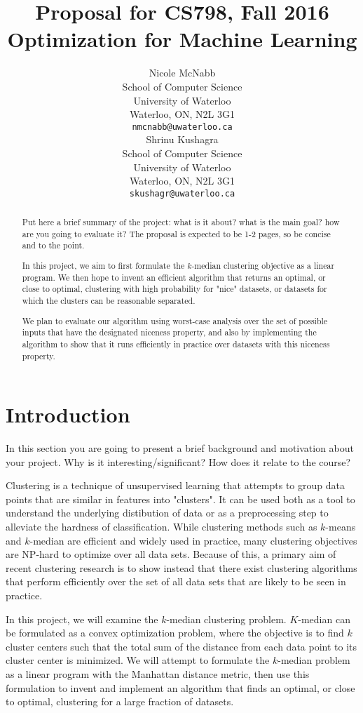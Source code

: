 \documentclass{article}
\title{Proposal for CS798, Fall 2016\\ \large Optimization for Machine Learning}
\author{
	Nicole McNabb \\
	School of Computer Science\\
	University of Waterloo\\
	Waterloo, ON, N2L 3G1 \\
	\texttt{nmcnabb@uwaterloo.ca} \\
	\And
	Shrinu Kushagra\\
	School of Computer Science\\
	University of Waterloo\\
	Waterloo, ON, N2L 3G1 \\
	\texttt{skushagr@uwaterloo.ca} \\	
}
\begin{document}
\maketitle

\begin{abstract} 
Put here a brief summary of the project: what is it about? what is the main goal? how are you going to evaluate it? The proposal is expected to be 1-2 pages, so be concise and to the point.

In this project, we aim to first formulate the $k$-median clustering objective as a linear program. We then hope to invent an efficient algorithm that returns an optimal, or close to optimal, clustering with high probability for "nice" datasets, or datasets for which the clusters can be reasonable separated. 

We plan to evaluate our algorithm using worst-case analysis over the set of possible inputs that have the designated niceness property, and also by implementing the algorithm to show that it runs efficiently in practice over datasets with this niceness property.
\end{abstract} 

\section{Introduction}
In this section you are going to present a brief background and motivation about your project. Why is it interesting/significant? How does it relate to the course?

Clustering is a technique of unsupervised learning that attempts to group data points that are similar in features into "clusters". It can be used both as a tool to understand the underlying distibution of data or as a preprocessing step to alleviate the hardness of classification. While clustering methods such as $k$-means and $k$-median are efficient and widely used in practice, many clustering objectives are NP-hard to optimize over all data sets. Because of this, a primary aim of recent clustering research is to show instead that there exist  clustering algorithms that perform efficiently over the set of all data sets that are likely to be seen in practice.

In this project, we will examine the $k$-median clustering problem. $K$-median can be formulated as a convex optimization problem, where the objective is to find $k$ cluster centers such that the total sum of the distance from each data point to its cluster center is minimized. We will attempt to formulate the $k$-median problem as a linear program with the Manhattan distance metric, then use this formulation to invent and implement an algorithm that finds an optimal, or close to optimal, clustering for a large fraction of datasets.
\end{document}
